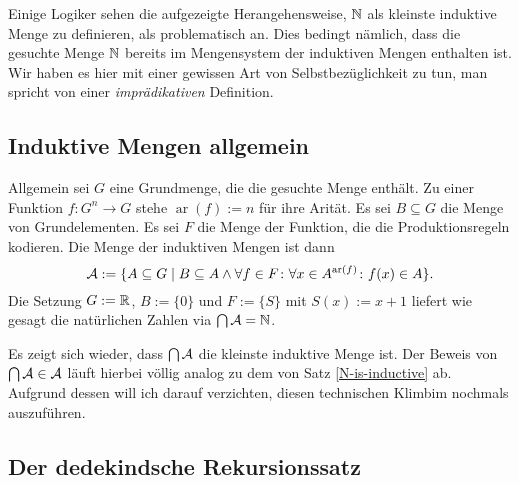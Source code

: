 Einige Logiker sehen die aufgezeigte Herangehensweise, $\mathbb N$ als kleinste
induktive Menge zu definieren, als problematisch an. Dies bedingt
nämlich, dass die gesuchte Menge $\mathbb N$ bereits im Mengensystem der
induktiven Mengen enthalten ist. Wir haben es hier mit einer gewissen
Art von Selbstbezüglichkeit zu tun, man spricht von einer
\emph{imprädikativen} Definition.

\subsection{Induktive Mengen allgemein}

Allgemein sei $G$ eine Grundmenge, die die gesuchte Menge enthält.
Zu einer Funktion $f\colon G^n\to G$ stehe $\operatorname{ar}(f):=n$
für ihre Arität. Es sei $B\subseteq G$ die Menge von Grundelementen.
Es sei $F$ die Menge der Funktion, die die Produktionsregeln kodieren.
Die Menge der induktiven Mengen ist dann
\[\mathcal{A} := \{A\subseteq G\mid B\subseteq A\land
\forall f\in F\colon\forall x\in A^{\operatorname{ar}(f)}\colon f(x)\in A\}.\]
Die Setzung $G:=\mathbb R$, $B:=\{0\}$ und $F:=\{S\}$ mit $S(x):=x+1$
liefert wie gesagt die natürlichen Zahlen via $\bigcap\mathcal{A} = \mathbb N$.

Es zeigt sich wieder, dass $\bigcap\mathcal{A}$ die kleinste
induktive Menge ist. Der Beweis von $\bigcap\mathcal{A}\in\mathcal{A}$ 
läuft hierbei völlig analog zu dem von Satz \ref{N-is-inductive} ab.
Aufgrund dessen will ich darauf verzichten, diesen technischen Klimbim
nochmals auszuführen.

\subsection{Der dedekindsche Rekursionssatz}

